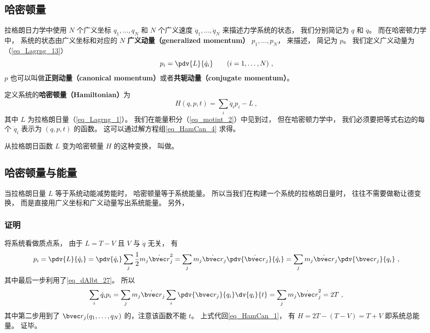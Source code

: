 

\subsection{哈密顿量}
拉格朗日力学中使用 $N$ 个广义坐标 $q_1,\dots,q_N$ 和 $N$ 个广义速度 $\dot q_1,\dots,\dot q_N$ 来描述力学系统的状态， 我们分别简记为 $q$ 和 $\dot q$。 而在哈密顿力学中， 系统的状态由广义坐标和对应的 $N$ \textbf{广义动量（generalized momentum）} $p_1, \dots, p_N$， 来描述， 简记为 $p$。 我们定义广义动量为（\autoref{eq_Lagrng_13}）
\begin{equation}\label{eq_HamCan_4}
p_i = \pdv{L}{\dot q_i} \qquad (i = 1,\dots,N)~,
\end{equation}
$p$ 也可以叫做\textbf{正则动量（canonical momentum）}或者\textbf{共轭动量（conjugate momentum）}。

定义系统的\textbf{哈密顿量（Hamiltonian）}为
\begin{equation}\label{eq_HamCan_1}
H(q,p,t) = \sum_i \dot q_i p_i - L~,
\end{equation}
其中 $L$ 为拉格朗日量（\autoref{eq_Lagrng_1}）。 我们在能量积分（\autoref{eq_motint_2}）中见到过， 但在哈密顿力学中， 我们必须要把等式右边的每个 $\dot q_i$ 表示为 $(q,p,t)$ 的函数。 这可以通过解方程组\autoref{eq_HamCan_4} 求得。

从拉格朗日函数 $L$ 变为哈密顿量 $H$ 的这种变换， 叫做。

\subsection{哈密顿量与能量}
当拉格朗日量 $L$ 等于系统动能减势能时， 哈密顿量等于系统能量。 所以当我们在构建一个系统的拉格朗日量时， 往往不需要做勒让德变换， 而是直接用广义坐标和广义动量写出系统能量。 另外， 

\subsubsection{证明}
将系统看做质点系， 由于 $L = T - V$ 且 $V$ 与 $\dot q$ 无关， 有
\begin{equation}\label{eq_HamCan_6}
p_i = \pdv{L}{\dot q_i} = \pdv{\dot q_i} \sum_j \frac12 m_j \dot{\bvec r}_j^2
= \sum_j m_j \dot{\bvec r}_j \pdv{\dot{\bvec r}_j}{\dot q_i}
= \sum_j m_j \dot{\bvec r}_j  \pdv{\bvec r_j}{q_i}~,
\end{equation}
其中最后一步利用了\autoref{eq_dAlbt_27}。 所以
\begin{equation}
 \sum_i \dot q_i p_i = \sum_j m_j \dot{\bvec r}_j \sum_i \pdv{\bvec r_j}{q_i}\dv{q_i}{t}
= \sum_j m_j \dot{\bvec r}_j^2 = 2T~,
\end{equation}
其中第二步用到了 $\bvec r_j(q_1,\dots,q_N)$ 的，注意该函数不能 $t$。 上式代回\autoref{eq_HamCan_1}， 有 $H = 2T - (T - V) = T + V$ 即系统总能量。 证毕。

